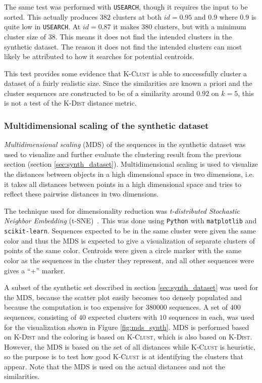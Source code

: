 The same test was performed with \texttt{USEARCH}, though it requires the input
to be sorted. This actually produces $382$ clusters at both $id=0.95$ and $0.9$
where $0.9$ is quite low in \texttt{USEARCH}. At $id=0.87$ it makes $380$
clusters, but with a minimum cluster size of $38$. This means it does not find
the intended clusters in the synthetic dataset. The reason it does not find the
intended clusters can most likely be attributed to how it searches for
potential centroids.

This test provides some evidence that \textsc{K-Clust} is able to successfully
cluster a dataset of a fairly realistic size. Since the similarities are known
a priori and the cluster sequences are constructed to be of a similarity around
$0.92$ on $k=5$, this is not a test of the \textsc{K-Dist} distance metric.

\subsubsection{Multidimensional scaling of the synthetic dataset}
\label{sec:mds_synth}

\emph{Multidimensional scaling} (MDS) of the sequences in the synthetic dataset
was used to visualize and further evaluate the clustering result from the
previous section (section \ref{sec:synth_dataset}). Multidimensional scaling is
used to visualize the distances between objects in a high dimensional space in
two dimensions, i.e. it takes all distances between points in a high
dimensional space and tries to reflect these pairwise distances in two
dimensions.

The technique used for dimensionality reduction was \emph{t-distributed
Stochastic Neighbor Embedding} (t-SNE)~\cite{maaten}. This was done using
\texttt{Python} with \texttt{matplotlib} and \texttt{scikit-learn}. Sequences
expected to be in the same cluster were given the same color and thus the MDS
is expected to give a visualization of separate clusters of points of the same
color. Centroids were given a circle marker with the same color as the
sequences in the cluster they represent, and all other sequences were gives a
``+'' marker.

A subset of the synthetic set described in section \ref{sec:synth_dataset} was
used for the MDS, because the scatter plot easily becomes too densely
populated and because the computation is too expensive for \num{380000}
sequences. A set of $400$ sequences, consisting of $40$ expected clusters with
$10$ sequences in each, was used for the visualization shown in Figure
\ref{fig:mds_synth}. MDS is performed based on \textsc{K-Dist} and the
coloring is based on \textsc{K-Clust}, which is also based on \textsc{K-Dist}.
However, the MDS is based on the set of all distances while \textsc{K-Clust}
is heuristic, so the purpose is to test how good \textsc{K-Clust} is at
identifying the clusters that appear. Note that the MDS is used on the actual
distances and not the similarities.

